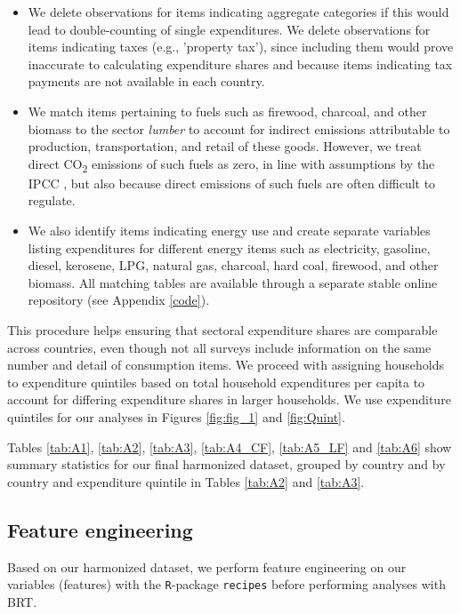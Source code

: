 \documentclass[12pt, a4paper]{article}
\begin{document}
\begin{refsection}
\begin{itemize}
    \item We delete observations for items indicating aggregate categories if this would lead to double-counting of single expenditures. We delete observations for items indicating taxes (e.g., 'property tax'), since including them would prove inaccurate to calculating expenditure shares and because items indicating tax payments are not available in each country.
    \item We match items pertaining to fuels such as firewood, charcoal, and other biomass to the sector \textit{lumber} to account for indirect emissions attributable to production, transportation, and retail of these goods. However, we treat direct CO\textsubscript{2} emissions of such fuels as zero, in line with assumptions by the IPCC \autocite{Grad.2023}, but also because direct emissions of such fuels are often difficult to regulate.
    \item We also identify items indicating energy use and create separate variables listing expenditures for different energy items such as electricity, gasoline, diesel, kerosene, LPG, natural gas, charcoal, hard coal, firewood, and other biomass. All matching tables are available through a separate stable online repository (see Appendix \ref{code}).
\end{itemize}

This procedure helps ensuring that sectoral expenditure shares are comparable across countries, even though not all surveys include information on the same number and detail of consumption items. We proceed with assigning households to expenditure quintiles based on total household expenditures per capita to account for differing expenditure shares in larger households. We use expenditure quintiles for our analyses in Figures \ref{fig:fig_1} and \ref{fig:Quint}.

Tables \ref{tab:A1}, \ref{tab:A2}, \ref{tab:A3}, \ref{tab:A4_CF}, \ref{tab:A5_LF} and \ref{tab:A6} show summary statistics for our final harmonized dataset, grouped by country and by country and expenditure quintile in Tables \ref{tab:A2} and \ref{tab:A3}. 


\subsection{Feature engineering} \label{sec:featureengineering}

Based on our harmonized dataset, we perform feature engineering on our variables (features) with the \texttt{R}-package \texttt{recipes} before performing analyses with BRT.


\end{refsection}
\end{document}
